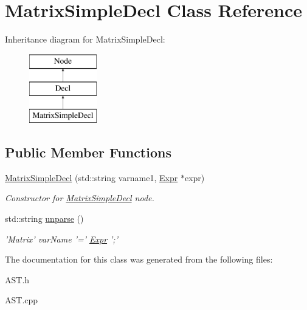 \hypertarget{classMatrixSimpleDecl}{\section{Matrix\-Simple\-Decl Class Reference}
\label{classMatrixSimpleDecl}
}
Inheritance diagram for Matrix\-Simple\-Decl\-:\begin{figure}[H]
\begin{center}
\leavevmode
\includegraphics[height=3.000000cm]{classMatrixSimpleDecl}
\end{center}
\end{figure}
\subsection*{Public Member Functions}
\begin{DoxyCompactItemize}
\item 
\hypertarget{classMatrixSimpleDecl_a8fb00a5fc84195e9c442f3caac880d26}{\hyperlink{classMatrixSimpleDecl_a8fb00a5fc84195e9c442f3caac880d26}{Matrix\-Simple\-Decl} (std\-::string varname1, \hyperlink{classExpr}{Expr} $\ast$expr)}\label{classMatrixSimpleDecl_a8fb00a5fc84195e9c442f3caac880d26}

\begin{DoxyCompactList}\small\item\em Constructor for \hyperlink{classMatrixSimpleDecl}{Matrix\-Simple\-Decl} node. \end{DoxyCompactList}\item 
\hypertarget{classMatrixSimpleDecl_a9267ccd3573cf8098ace8bbe5f5be694}{std\-::string \hyperlink{classMatrixSimpleDecl_a9267ccd3573cf8098ace8bbe5f5be694}{unparse} ()}\label{classMatrixSimpleDecl_a9267ccd3573cf8098ace8bbe5f5be694}

\begin{DoxyCompactList}\small\item\em 'Matrix' var\-Name '=' \hyperlink{classExpr}{Expr} ';' \end{DoxyCompactList}\end{DoxyCompactItemize}


The documentation for this class was generated from the following files\-:\begin{DoxyCompactItemize}
\item 
A\-S\-T.\-h\item 
A\-S\-T.\-cpp\end{DoxyCompactItemize}
